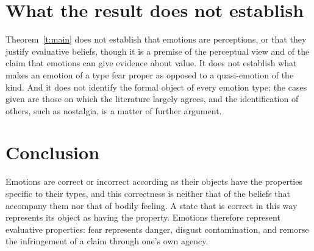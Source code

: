 \documentclass{situationist-preprint}
\begin{document}
\section{What the result does not establish}

Theorem~\ref{t:main} does not establish that emotions are perceptions, or that they justify evaluative beliefs, though it is a premise of the perceptual view and of the claim that emotions can give evidence about value. It does not establish what makes an emotion of a type fear proper as opposed to a quasi-emotion of the kind. And it does not identify the formal object of every emotion type; the cases given are those on which the literature largely agrees, and the identification of others, such as nostalgia, is a matter of further argument.

\section{Conclusion}

Emotions are correct or incorrect according as their objects have the properties specific to their types, and this correctness is neither that of the beliefs that accompany them nor that of bodily feeling. A state that is correct in this way represents its object as having the property. Emotions therefore represent evaluative properties: fear represents danger, disgust contamination, and remorse the infringement of a claim through one's own agency.
\end{document}
